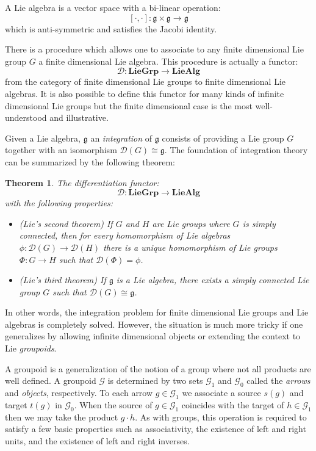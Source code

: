\documentclass[11pt, letterpaper]{article}
\newcommand{\CG}{\mathcal{G}}
\newtheorem{theorem}{Theorem}
\begin{document}
A Lie algebra is a vector space with a bi-linear operation:
\[ [\cdot , \cdot  ] \colon \mathfrak{g} \times \mathfrak{g} \to \mathfrak{g} \] 
which is anti-symmetric and satisfies the Jacobi identity.

There is a procedure which allows one to associate to any finite dimensional Lie group \( G \) a finite dimensional Lie algebra. This procedure is actually a functor:
\[ \mathcal{D} \colon \mathbf{LieGrp}  \to \mathbf{LieAlg} \]
from the category of finite dimensional Lie groups to finite dimensional Lie algebras. It is also possible to define this functor for many kinds of infinite dimensional Lie groups but the finite dimensional case is the most well-understood and illustrative.

Given a Lie algebra, \( \mathfrak{g} \) an \emph{integration} of \( \mathfrak{g} \) consists of providing a Lie group \( G \) together with an isomorphism \( \mathcal{D}(G) \cong \mathfrak{g}\). The foundation of integration theory can be summarized by the following theorem:
\begin{theorem}
The differentiation functor:
    \[ \mathcal{D} \colon \mathbf{LieGrp} \to \mathbf{LieAlg}\]
    with the following properties:
    \begin{itemize}
        \item (Lie's second theorem) If \( G \) and \( H\) are Lie groups where \( G \) is simply connected, then for every homomorphism of Lie algebras \( \phi \colon \mathcal{D}(G) \to \mathcal{D}(H) \) there is a unique homomorphism of Lie groups \( \Phi \colon G \to H \) such that \( \mathcal{D}(\Phi) = \phi\).
        \item (Lie's third theorem) If \( \mathfrak{g} \) is a Lie algebra, there exists a simply connected Lie group \( G \) such that \( \mathcal{D}(G) \cong \mathfrak{g} \).
    \end{itemize}
\end{theorem}
In other words, the integration problem for finite dimensional Lie groups and Lie algebras is completely solved. However, the situation is much more tricky if one generalizes by allowing infinite dimensional objects or extending the context to Lie \emph{groupoids}.

A groupoid is a generalization of the notion of a group where not all products are well defined. A groupoid \( \CG \) is determined by two sets \( \CG_1\) and \( \CG_0 \) called  the \emph{arrows} and \emph{objects}, respectively. To each arrow \( g \in \CG_1 \) we associate a source \( s(g)\) and target \( t(g)\) in \( \CG_0 \). When the source of \( g \in \CG_1 \) coincides with the target of \( h \in \CG_1 \) then we may take the product \( g \cdot h\).
As with groups, this operation is required to satisfy a few basic properties such as associativity, the existence of left and right units, and the existence of left and right inverses.
\end{document}
